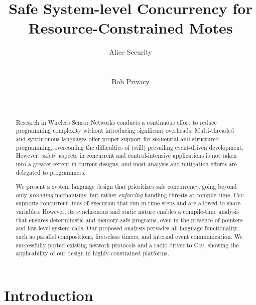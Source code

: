 \documentclass[10pt]{sensys-proc}
\author{
%
\alignauthor Alice Security \\
        \affaddr{Department of Computer Science}\\
        \affaddr{University of Southern California}\\
       \email{alice@example.edu}
\alignauthor Bob Privacy \\
    \affaddr{Networked Embedded Systems Group}\\
    \affaddr{Swedish Institute of Computer Science}\\
    \email{bob@example.se}
}
\title{Safe System-level Concurrency for Resource-Constrained Motes}
\newcommand{\CEU}{\textsc{C\'{e}u}\xspace}
\begin{document}
\maketitle

\begin{abstract}

Research in Wireless Sensor Networks conducts a continuous effort to reduce 
programming complexity without introducing significant overheads.
Multi-threaded and synchronous languages offer proper support for sequential 
and structured programming, overcoming the difficulties of (still) prevailing 
event-driven development.
However, safety aspects in concurrent and control-intensive applications is not 
taken into a greater extent in current designs, and most analysis and 
mitigation efforts are delegated to programmers.
  
We present a system language design that prioritizes safe concurrency, going
beyond only \emph{providing} mechanisms, but rather \emph{enforcing} handling 
threats at compile time.
\CEU supports concurrent lines of execution that run in time steps and are 
allowed to share variables.
However, its synchronous and static nature enables a compile-time analysis that 
ensures deterministic and memory-safe programs, even in the presence of 
pointers and low-level system calls.
Our proposed analysis pervades all language functionality, such as parallel 
compositions, first-class timers, and internal event communication.
We successfully ported existing network protocols and a radio driver to \CEU, 
showing the applicability of our design in highly-constrained platforms.

%

\end{abstract}




\section{Introduction}
\label{sec.intro}
\end{document}
